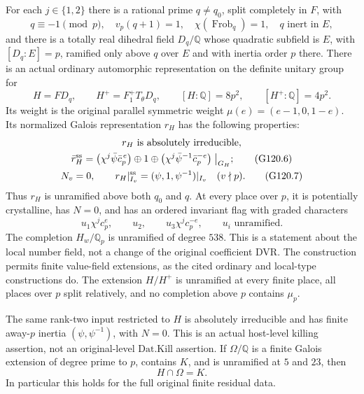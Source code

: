 \begin{theorem}
For each $j\in\{1,2\}$ there is a rational prime $q\ne q_0$, split
completely in $F$, with
\[
 q\equiv-1\pmod p,\quad v_p(q+1)=1,\quad
 \chi(\operatorname{Frob}_q)=1,\quad q\text{ inert in }E,
                                                                    \tag{G120.4}
\]
and there is a totally real dihedral field $D_q/\mathbb Q$ whose
quadratic subfield is $E$, with $[D_q:E]=p$, ramified only above $q$
over $E$ and with inertia order $p$ there.
There is an actual ordinary automorphic representation on the definite
unitary group for
\[
 H=FD_q,
 \qquad H^+=F_1^+T_\theta D_q,
 \qquad [H:\mathbb Q]=8p^2,
 \qquad [H^+:\mathbb Q]=4p^2.                       \tag{G120.5}
\]
Its weight is the original parallel symmetric weight
$\mu(e)=(e-1,0,1-e)$.  Its normalized Galois representation $r_H$
has the following properties:
\begin{gather}
 r_H\text{ is absolutely irreducible},\notag\\
 \bar r_H^{\rm ss}
  =\left(\chi^j\bar\psi\bar c_p^{\,e}\right)
       \oplus1\oplus
    \left(\chi^j\bar\psi^{-1}\bar c_p^{-e}\right)\bigm|_{G_H};
                                                               \tag{G120.6}\\
 N_v=0,\qquad
 r_H|_{I_v}^{\rm ss}=(\psi,1,\psi^{-1})|_{I_v}
                      \quad(v\nmid p).                         \tag{G120.7}
\end{gather}
Thus $r_H$ is unramified above both $q_0$ and $q$.
At every place over $p$, it is potentially crystalline, has $N=0$,
and has an ordered invariant flag with graded characters
\[
 u_1\chi^j c_p^e,\qquad u_2,\qquad u_3\chi^j c_p^{-e},
               \qquad u_i\text{ unramified}.                    \tag{G120.8}
\]
The completion $H_w/\mathbb Q_p$ is unramified of degree $538$.
This is a statement about the local number field, not a change of the
original coefficient DVR.  The construction permits finite value-field
extensions, as the cited ordinary and local-type constructions do.
The extension $H/H^+$ is unramified at every finite place, all places
over $p$ split relatively, and no completion above $p$ contains $\mu_p$.

The same rank-two input restricted to $H$ is absolutely irreducible
and has finite away-$p$ inertia $(\psi,\psi^{-1})$, with $N=0$.
This is an actual host-level killing assertion, not an original-level
$\mathrm{Dat.Kill}$ assertion.
If $\Omega/\mathbb Q$ is a finite Galois extension of degree prime
to $p$, contains $K$, and is unramified at $5$ and $23$, then
\[
                         H\cap\Omega=K.                         \tag{G120.9a}
\]
In particular this holds for the full original finite residual data.


\end{theorem}
